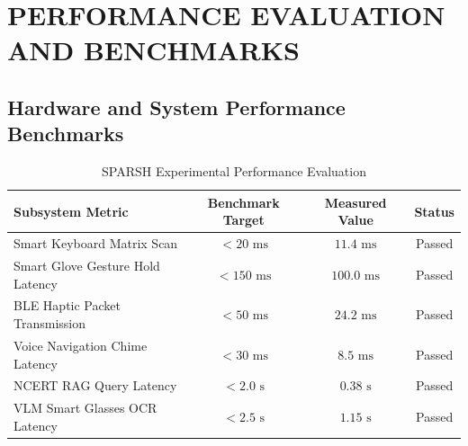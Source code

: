 \documentclass[12pt,a4paper]{report}
\begin{document}
\chapter{PERFORMANCE EVALUATION AND BENCHMARKS}

\section{Hardware and System Performance Benchmarks}
\begin{table}[htbp]
    \centering
    \caption{SPARSH Experimental Performance Evaluation}
    \vspace{0.2cm}
    \renewcommand{\arraystretch}{1.2}
    \begin{tabular}{|l|c|c|c|}
        \hline
        \textbf{Subsystem Metric} & \textbf{Benchmark Target} & \textbf{Measured Value} & \textbf{Status} \\ \hline
        Smart Keyboard Matrix Scan & $< 20 \text{ ms}$ & $11.4 \text{ ms}$ & Passed \\ \hline
        Smart Glove Gesture Hold Latency & $< 150 \text{ ms}$ & $100.0 \text{ ms}$ & Passed \\ \hline
        BLE Haptic Packet Transmission & $< 50 \text{ ms}$ & $24.2 \text{ ms}$ & Passed \\ \hline
        Voice Navigation Chime Latency & $< 30 \text{ ms}$ & $8.5 \text{ ms}$ & Passed \\ \hline
        NCERT RAG Query Latency & $< 2.0 \text{ s}$ & $0.38 \text{ s}$ & Passed \\ \hline
        VLM Smart Glasses OCR Latency & $< 2.5 \text{ s}$ & $1.15 \text{ s}$ & Passed \\ \hline
    \end{tabular}
\end{table}
\end{document}
